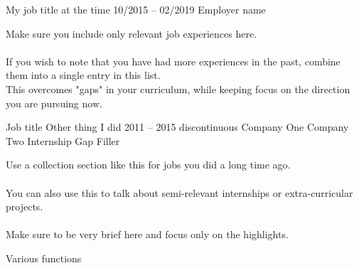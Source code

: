 \documentclass[9pt, blue]{./template/developercv} %
\begin{document}
\begin{entrylist}
{		
	}
	{My job title at the time}
	\entry
		{10/2015 -- 02/2019}
		{}
		{Employer name}
		{
			\vspace{0.3mm}
			\begin{minipage}[t]{0.75\textwidth}
				\vspace{-\baselineskip}
				\itemmarker Make sure you include only relevant job experiences here.\\
				\vspace{-3mm}\\
				\itemmarker If you wish to note that you have had more experiences in the past, combine them into a single entry in this list. \\
				\itemmarker This overcomes "gaps" in your curriculum, while keeping focus on the direction you are pursuing now. \\
				\vspace{-3mm}
			\end{minipage}

	   }
		{Job title \band Other thing I did}
	\entry
	{2011 -- 2015 \pipe\tiny{discontinuous}}
	{Company One \cpipe Company Two }
	{Internship \space\cpipe\space Gap Filler}
	{
		\vspace{0.4mm}
		\begin{minipage}[t]{0.75\textwidth} %
			\vspace{-\baselineskip} \small
			\vspace{-2mm}
			\itemmarker Use a collection section like this for jobs you did a long time ago.\\
			\vspace{-3mm}\\
			\itemmarker You can also use this to talk about semi-relevant internships or extra-curricular projects.\\
			\vspace{-3mm}\\
			\itemmarker Make sure to be very brief here and focus only on the highlights.
		\end{minipage}
	}
	{Various functions}
\end{entrylist}

\end{document}
